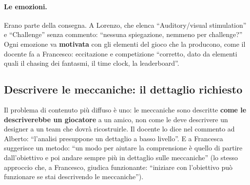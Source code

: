 \paragraph{Le emozioni.} Erano parte della consegna. A Lorenzo, che elenca
``Auditory/visual stimulation'' e ``Challenge'' senza commento: ``nessuna
spiegazione, nemmeno per challenge?'' Ogni emozione va \textbf{motivata} con
gli elementi del gioco che la producono, come il docente fa a Francesco:
eccitazione e competizione ``corretto, dato da elementi quali il chasing dei
fantasmi, il time clock, la leaderboard''.

\subsection{Descrivere le meccaniche: il dettaglio richiesto}
\label{rv:t1:sec:meccaniche}

Il problema di contenuto più diffuso è uno: le meccaniche sono descritte
\textbf{come le descriverebbe un giocatore} a un amico, non come le deve
descrivere un designer a un team che dovrà ricostruirle. Il docente lo dice
nel commento ad Alberto: ``l'analisi presuppone un dettaglio a basso
livello''. E a Francesca suggerisce un metodo: ``un modo per aiutare la
comprensione è quello di partire dall'obiettivo e poi andare sempre più in
dettaglio sulle meccaniche'' (lo stesso approccio che, a Francesco, giudica
funzionante: ``iniziare con l'obiettivo può funzionare se stai descrivendo le
meccaniche'').

